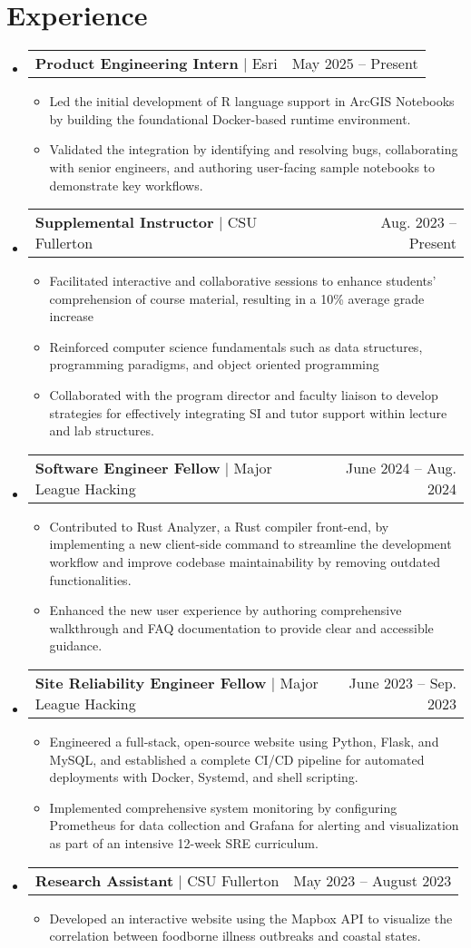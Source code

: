 \documentclass[letterpaper,11pt]{article}
\makeatletter
\newcommand{\resumeItem}[1]{
  \item\small{
    {#1 \vspace{-2pt}}
  }
}
\newcommand{\resumeProjectHeading}[2]{
    \item
    \begin{tabular*}{0.97\textwidth}{l@{\extracolsep{\fill}}r}
      \small#1 & #2 \\
    \end{tabular*}\vspace{-7pt}
}
\newcommand{\resumeSubHeadingListStart}{\begin{itemize}[leftmargin=0.15in, label={}]}
\newcommand{\resumeSubHeadingListEnd}{\end{itemize}}
\newcommand{\resumeItemListStart}{\begin{itemize}}
\newcommand{\resumeItemListEnd}{\end{itemize}\vspace{-5pt}}
\makeatother
\begin{document}
\section{Experience}
  \resumeSubHeadingListStart
    \resumeProjectHeading
            {\textbf{Product Engineering Intern} $|$ {Esri}}{May 2025 -- Present}
            \resumeItemListStart
              \resumeItem{Led the initial development of R language support in ArcGIS Notebooks by building the foundational Docker-based runtime environment.}
              \resumeItem{Validated the integration by identifying and resolving bugs, collaborating with senior engineers, and authoring user-facing sample notebooks to demonstrate key workflows.}
    \resumeItemListEnd
    \resumeProjectHeading
            {\textbf{Supplemental Instructor} $|$ {CSU Fullerton}}{Aug. 2023 -- Present}
            \resumeItemListStart
              \resumeItem{Facilitated interactive and collaborative sessions to enhance students' comprehension of course material, resulting in a 10\% average grade increase}
              \resumeItem{Reinforced computer science fundamentals such as data structures, programming paradigms, and object oriented programming}
              \resumeItem{Collaborated with the program director and faculty liaison to develop strategies for effectively integrating SI and tutor support within lecture and lab structures.}
    \resumeItemListEnd
    \resumeProjectHeading
          {\textbf{Software Engineer Fellow} $|$ {Major League Hacking}}{June 2024 -- Aug. 2024}
          \resumeItemListStart
            \resumeItem{Contributed to Rust Analyzer, a Rust compiler front-end, by implementing a new client-side command to streamline the development workflow and improve codebase maintainability by removing outdated functionalities.}
            \resumeItem{Enhanced the new user experience by authoring comprehensive walkthrough and FAQ documentation to provide clear and accessible guidance.}
          \resumeItemListEnd
    \resumeProjectHeading
          {\textbf{Site Reliability Engineer Fellow} $|$ {Major League Hacking}}{June 2023 -- Sep. 2023}
          \resumeItemListStart
            \resumeItem{Engineered a full-stack, open-source website using Python, Flask, and MySQL, and established a complete CI/CD pipeline for automated deployments with Docker, Systemd, and shell scripting.}
            \resumeItem{Implemented comprehensive system monitoring by configuring Prometheus for data collection and Grafana for alerting and visualization as part of an intensive 12-week SRE curriculum.}
          \resumeItemListEnd
    \resumeProjectHeading
          {\textbf{Research Assistant} $|$ {CSU Fullerton}}{May 2023 -- August 2023}
          \resumeItemListStart
            \resumeItem{Developed an interactive website using the Mapbox API to visualize the correlation between foodborne illness outbreaks and coastal states.}
          \resumeItemListEnd
  \resumeSubHeadingListEnd
\end{document}
